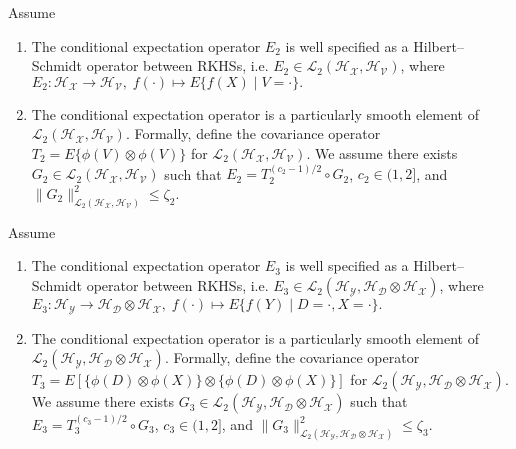 \begin{assumption}\label{assumption:smooth_CATE}
Assume
\begin{enumerate}
\item The conditional expectation operator $E_2$ is well specified as a Hilbert--Schmidt operator between RKHSs, i.e. $E_2\in \mathcal{L}_2(\mathcal{H}_{\mathcal{X}},\mathcal{H}_{\mathcal{V}})$, where
    $
    E_2:\mathcal{H}_{\mathcal{X}} \rightarrow \mathcal{H}_{\mathcal{V}},\; f(\cdot)\mapsto E\{f(X) \mid V=\cdot\}.
    $
    \item The conditional expectation operator is a particularly smooth element of $\mathcal{L}_2(\mathcal{H}_{\mathcal{X}},\mathcal{H}_{\mathcal{V}})$. Formally, define the covariance operator $T_2=E\{\phi(V)\otimes \phi(V)\}$ for $\mathcal{L}_2(\mathcal{H}_{\mathcal{X}},\mathcal{H}_{\mathcal{V}})$.
    We assume there exists $ G_2\in \mathcal{L}_2(\mathcal{H}_{\mathcal{X}},\mathcal{H}_{\mathcal{V}})$ such that $E_2=T_2^{(c_2-1)/2}\circ G_2$, $c_2\in(1,2]$, and $\|G_2\|^2_{\mathcal{L}_2(\mathcal{H}_{\mathcal{X}},\mathcal{H}_{\mathcal{V}})}\leq\zeta_2$.
    \end{enumerate}
\end{assumption}

\begin{assumption}\label{assumption:smooth_D:ATE}
Assume
\begin{enumerate}
\item The conditional expectation operator $E_3$ is well specified as a Hilbert--Schmidt operator between RKHSs, i.e. $E_3\in \mathcal{L}_2(\mathcal{H}_{\mathcal{Y}},\mathcal{H}_{\mathcal{D}}\otimes \mathcal{H}_{\mathcal{X}})$, where
    $
    E_3:\mathcal{H}_{\mathcal{Y}} \rightarrow \mathcal{H}_{\mathcal{D}}\otimes \mathcal{H}_{\mathcal{X}},\; f(\cdot)\mapsto E\{f(Y) \mid D=\cdot,X=\cdot \}.
    $
    \item The conditional expectation operator is a particularly smooth element of $\mathcal{L}_2(\mathcal{H}_{\mathcal{Y}},\mathcal{H}_{\mathcal{D}}\otimes \mathcal{H}_{\mathcal{X}})$. Formally, define the covariance operator $T_3=E[\{\phi(D)\otimes \phi(X)\} \otimes  \{\phi(D)\otimes \phi(X)\}]$ for $\mathcal{L}_2(\mathcal{H}_{\mathcal{Y}},\mathcal{H}_{\mathcal{D}}\otimes \mathcal{H}_{\mathcal{X}})$.
    We assume there exists $ G_3\in \mathcal{L}_2(\mathcal{H}_{\mathcal{Y}},\mathcal{H}_{\mathcal{D}}\otimes \mathcal{H}_{\mathcal{X}})$ such that $E_3=T_3^{(c_3-1)/2}\circ G_3$, $c_3\in(1,2]$, and $\|G_3\|^2_{\mathcal{L}_2(\mathcal{H}_{\mathcal{Y}},\mathcal{H}_{\mathcal{D}}\otimes \mathcal{H}_{\mathcal{X}})}\leq\zeta_3$.
    \end{enumerate}
\end{assumption}

